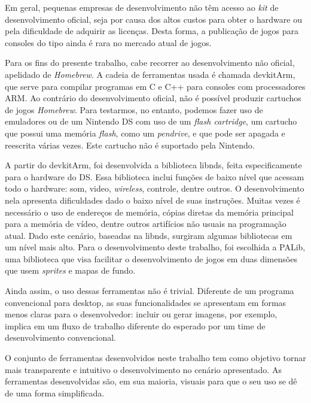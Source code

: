 \documentclass[brazil]{abnt}
\begin{document}
Em geral, pequenas empresas de desenvolvimento não têm acesso ao \textit{kit} de desenvolvimento oficial, seja por causa dos altos custos para obter o hardware ou pela dificuldade de adquirir as licenças. Desta forma, a publicação de jogos para consoles do tipo ainda é rara no mercado atual de jogos.

Para os fins do presente trabalho, cabe recorrer ao desenvolvimento não oficial, apelidado de \textit{Homebrew}. A cadeia de ferramentas usada é chamada devkitArm, que serve para compilar programas em C e C++ para consoles com processadores ARM. Ao contrário do desenvolvimento oficial, não é possível produzir cartuchos de jogos \textit{Homebrew}. Para testarmos, no entanto, podemos fazer uso de emuladores ou de um Nintendo DS com uso de um \textit{flash cartridge}, um cartucho que possui uma memória \textit{flash}, como um \textit{pendrive}, e que pode ser apagada e reescrita várias vezes. Este cartucho não é suportado pela Nintendo.

A partir do devkitArm, foi desenvolvida a biblioteca libnds, feita especificamente para o hardware do DS. Essa biblioteca inclui funções de baixo nível que acessam todo o hardware: som, video, \textit{wireless}, controle, dentre outros. O desenvolvimento nela apresenta dificuldades dado o baixo nível de suas instruções. Muitas vezes é necessário o uso de endereços de memória, cópias diretas da memória principal para a memória de vídeo, dentre outros artifícios não usuais na programação atual. Dado este cenário, baseadas na libnds, surgiram algumas bibliotecas em um nível mais alto. Para o desenvolvimento deste trabalho, foi escolhida a PALib, uma biblioteca que visa facilitar o desenvolvimento de jogos em duas dimensões que usem \textit{sprites} e mapas de fundo.

Ainda assim, o uso dessas ferramentas não é trivial. Diferente de um programa convencional para desktop, as suas funcionalidades se apresentam em formas menos claras para o desenvolvedor: incluir ou gerar imagens, por exemplo, implica em um fluxo de trabalho diferente do esperado por um time de desenvolvimento convencional. 

O conjunto de ferramentas desenvolvidos neste trabalho tem como objetivo tornar mais transparente e intuitivo o desenvolvimento no cenário apresentado. As ferramentas desenvolvidas são, em sua maioria, visuais para que o seu uso se dê de uma forma simplificada.

\end{document}
